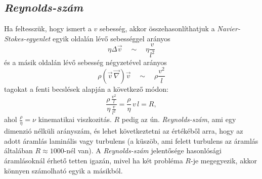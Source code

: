 \documentclass[a4paper, titlepage]{article}
\begin{document}
\subsection*{\textit{Reynolds-szám}}
Ha feltesszük, hogy ismert a $v$ sebesség, akkor összehasonlíthatjuk a \textit{Navier-Stokes-egyenlet} egyik oldalán lévő sebességgel arányos
$$\eta\Delta\vec{v}\quad\sim\quad\eta\frac{v}{l^2}$$
és a másik oldalán lévő sebesség négyzetével arányos
$$\rho(\vec{v}\,\vec{\nabla})\vec{v}\quad\sim\quad\rho\frac{v^2}{l}$$
tagokat a fenti becslések alapján a következő módon:
\begin{equation}
\frac{\rho\,\frac{v^2}{l}}{\eta\, \frac{v}{l^2}}=\frac{\rho}{\eta}\,v\,l=R,
\end{equation}
ahol $\frac{\rho}{\eta}=\nu$ kinematikai viszkozitás. $R$ pedig az ún. \textit{Reynolds-szám}, ami egy dimenzió nélküli arányszám, és lehet következtetni az értékéből arra, hogy az adott áramlás laminális vagy turbulens (a küszöb, ami felett turbulens az áramlás általában $R\approx1000$-nél van). A \textit{Reynolds-szám} jelentősége hasonlósági áramlásoknál érhető tetten igazán, mivel ha két probléma $R$-je megegyezik, akkor könnyen számolható egyik a másikból. 
\end{document}
